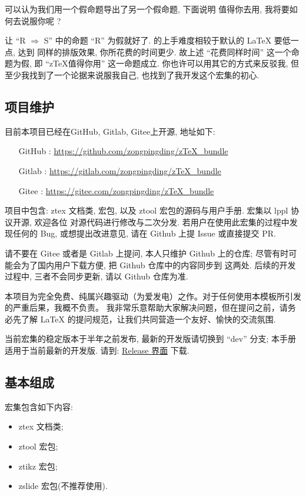 \documentclass[
  hyper, lang=cn,
  mathSpec={envStyle=leftbar},
]{../../zlatex/code/ztex}
\newcommand{\pkg}[1]{\textsf{#1}}
\newcommand{\cls}[1]{\textsf{#1}}
\def\lrr#1{\ensuremath{\Rightarrow}}
\begin{document}
可以认为我们用一个假命题导出了另一个假命题, 下面说明 \zTeX{} 值得你去用, 我将要如何去说服你呢 ? 


让 ``R\; \lrr{} S'' 中的命题 ``R'' 为假就好了. \ztex{} 的上手难度相较于默认的 \LaTeX{} 要低一点, 达到
同样的排版效果, 你所花费的时间更少. 故上述 ``花费同样时间'' 这一个命题为假, 即 ``z\TeX{}值得你用'' 这一命题成立.
你也许可以用其它的方式来反驳我, 但至少我找到了一个论据来说服我自己, 也找到了我开发这个宏集的初心.

\subsection{项目维护}
目前本项目已经在GitHub, Gitlab, Gitee上开源, 地址如下:

\hspace*{6em}\parbox{\textwidth}{
\begin{itemize}
  \item [GitHub]: \href{https://github.com/zongpingding/zTeX_bundle}{https://github.com/zongpingding/zTeX\_bundle}
  \item [Gitlab]: \href{https://gitlab.com/zongpingding/zTeX_bundle}{https://gitlab.com/zongpingding/zTeX\_bundle}
  \item [Gitee] : \href{https://gitee.com/zongpingding/zTeX_bundle}{https://gitee.com/zongpingding/zTeX\_bundle}
\end{itemize}}

项目中包含: \cls{ztex} 文档类, \zTikZ{} 宏包, 以及 \pkg{ztool} 宏包的源码与用户手册. \ztex{} 宏集以 lppl 协议开源, 欢迎各位
对源代码进行修改与二次分发. 若用户在使用此宏集的过程中发现任何的 Bug, 或想提出改进意见, 请在 Github 上提 Issue 或直接提交 PR. 


请不要在 Gitee 或者是 Gitlab 上提问, 本人只维护 Github 上的仓库; 尽管有时可能会为了国内用户下载方便, 把 Github 仓库中的内容同步到
这两处. 后续的开发过程中, 三者不会同步更新, 请以 Github 仓库为准.

本项目为完全免费、纯属兴趣驱动（为爱发电）之作。对于任何使用本模板所引发的严重后果，我概不负责。
我非常乐意帮助大家解决问题，但在提问之前，请务必先了解 \LaTeX{} 的提问规范，让我们共同营造一个友好、愉快的交流氛围.

当前宏集的稳定版本于半年之前发布, 最新的开发版请切换到 ``dev'' 分支; 本手册适用于当前最新的开发版.
请到: \href{https://github.com/zongpingding/zTeX_bundle/releases}{Release 界面} 下载.


\clearpage
\subsection{基本组成}
\ztex{} 宏集包含如下内容:
\begin{multicols}{2}
  \begin{itemize}
  \item \cls{ztex} 文档类;
  \item \pkg{ztool} 宏包;
  \item \pkg{ztikz} 宏包;
  \item \pkg{zslide} 宏包(不推荐使用).
\end{itemize}
\end{multicols}
\end{document}
